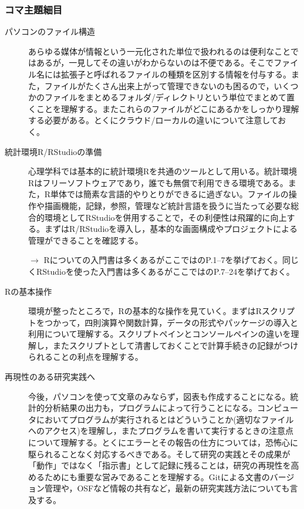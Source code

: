 \subsubsection{コマ主題細目}
\begin{description}

	\item[パソコンのファイル構造]あらゆる媒体が情報という一元化された単位で扱われるのは便利なことではあるが，一見してその違いがわからないのは不便である。そこでファイル名には拡張子と呼ばれるファイルの種類を区別する情報を付与する。また，ファイルがたくさん出来上がって管理できないのも困るので，いくつかのファイルをまとめるフォルダ/ディレクトリという単位でまとめて置くことを理解する。またこれらのファイルがどこにあるかをしっかり理解する必要がある。とくにクラウド/ローカルの違いについて注意しておく。


	\item[統計環境R/RStudioの準備] 心理学科では基本的に統計環境Rを共通のツールとして用いる。統計環境Rはフリーソフトウェアであり，誰でも無償で利用できる環境である。また，R単体では簡素な言語的やりとりができるに過ぎない。ファイルの操作や描画機能，記録，参照，管理など統計言語を扱うに当たって必要な総合的環境としてRStudioを併用することで，その利便性は飛躍的に向上する。まずはR/RStudioを導入し，基本的な画面構成やプロジェクトによる管理ができることを確認する。
	      \begin{flushright}
		      $\to$ Rについての入門書は多くあるがここでは\textcite{kosugi2019}のP.1--7を挙げておく。同じくRStudioを使った入門書は多くあるがここでは\textcite{kosugi2019}のP.7--24を挙げておく。
	      \end{flushright}

	\item[Rの基本操作]環境が整ったところで，Rの基本的な操作を見ていく。まずはRスクリプトをつかって，四則演算や関数計算，データの形式やパッケージの導入と利用について理解する。スクリプトペインとコンソールペインの違いを理解し，またスクリプトとして清書しておくことで計算手続きの記録がつけられることの利点を理解する。

	\item[再現性のある研究実践へ]今後，パソコンを使って文章のみならず，図表も作成することになる。統計的分析結果の出力も，プログラムによって行うことになる。コンピュータにおいてプログラムが実行されるとはどういうことか(適切なファイルへのアクセス)を理解し，またプログラムを書いて実行するときの注意点について理解する。とくにエラーとその報告の仕方については，恐怖心に駆られることなく対応するべきである。そして研究の実践とその成果が「動作」ではなく「指示書」として記録に残ることは，研究の再現性を高めるためにも重要な営みであることを理解する。Gitによる文書のバージョン管理や，OSFなど情報の共有など，最新の研究実践方法についても言及する。


\end{description}
